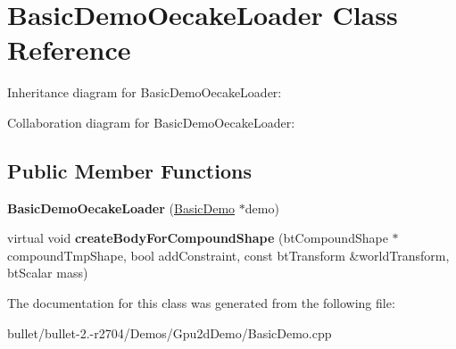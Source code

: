 \hypertarget{class_basic_demo_oecake_loader}{\section{Basic\+Demo\+Oecake\+Loader Class Reference}
\label{class_basic_demo_oecake_loader}
}


Inheritance diagram for Basic\+Demo\+Oecake\+Loader\+:


Collaboration diagram for Basic\+Demo\+Oecake\+Loader\+:
\subsection*{Public Member Functions}
\begin{DoxyCompactItemize}
\item 
\hypertarget{class_basic_demo_oecake_loader_ab0011bdf0f41656926a7cf58a1a398e6}{{\bfseries Basic\+Demo\+Oecake\+Loader} (\hyperlink{class_basic_demo}{Basic\+Demo} $\ast$demo)}\label{class_basic_demo_oecake_loader_ab0011bdf0f41656926a7cf58a1a398e6}

\item 
\hypertarget{class_basic_demo_oecake_loader_a0fdd64874391a89bc8e46b263499707d}{virtual void {\bfseries create\+Body\+For\+Compound\+Shape} (bt\+Compound\+Shape $\ast$compound\+Tmp\+Shape, bool add\+Constraint, const bt\+Transform \&world\+Transform, bt\+Scalar mass)}\label{class_basic_demo_oecake_loader_a0fdd64874391a89bc8e46b263499707d}

\end{DoxyCompactItemize}


The documentation for this class was generated from the following file\+:\begin{DoxyCompactItemize}
\item 
bullet/bullet-\/2.-\/r2704/\+Demos/\+Gpu2d\+Demo/Basic\+Demo.\+cpp\end{DoxyCompactItemize}
